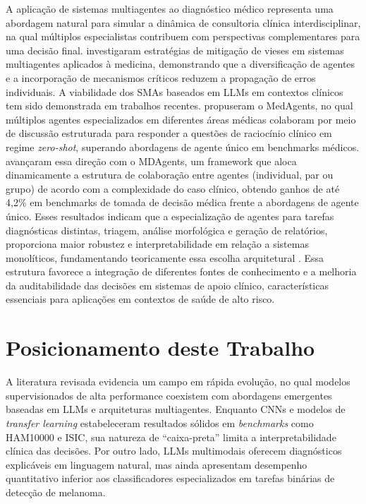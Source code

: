A aplicação de sistemas multiagentes ao diagnóstico médico representa uma abordagem natural para simular a dinâmica de consultoria clínica interdisciplinar, na qual múltiplos especialistas contribuem com perspectivas complementares para uma decisão final.  investigaram estratégias de mitigação de vieses em sistemas multiagentes aplicados à medicina, demonstrando que a diversificação de agentes e a incorporação de mecanismos críticos reduzem a propagação de erros individuais. A viabilidade dos SMAs baseados em LLMs em contextos clínicos tem sido demonstrada em trabalhos recentes.  propuseram o MedAgents, no qual múltiplos agentes especializados em diferentes áreas médicas colaboram por meio de discussão estruturada para responder a questões de raciocínio clínico em regime \textit{zero-shot}, superando abordagens de agente único em benchmarks médicos.  avançaram essa direção com o MDAgents, um framework que aloca dinamicamente a estrutura de colaboração entre agentes (individual, par ou grupo) de acordo com a complexidade do caso clínico, obtendo ganhos de até 4,2\% em benchmarks de tomada de decisão médica frente a abordagens de agente único. Esses resultados indicam que a especialização de agentes para tarefas diagnósticas distintas, triagem, análise morfológica e geração de relatórios, proporciona maior robustez e interpretabilidade em relação a sistemas monolíticos, fundamentando teoricamente essa escolha arquitetural \cite{wooldridge2009introduction}. Essa estrutura favorece a integração de diferentes fontes de conhecimento e a melhoria da auditabilidade das decisões em sistemas de apoio clínico, características essenciais para aplicações em contextos de saúde de alto risco.


\section{Posicionamento deste Trabalho}

A literatura revisada evidencia um campo em rápida evolução, no qual modelos supervisionados de alta performance coexistem com abordagens emergentes baseadas em LLMs e arquiteturas multiagentes. Enquanto CNNs e modelos de \textit{transfer learning} estabeleceram resultados sólidos em \textit{benchmarks} como HAM10000 e ISIC, sua natureza de ``caixa-preta'' limita a interpretabilidade clínica das decisões. Por outro lado, LLMs multimodais oferecem diagnósticos explicáveis em linguagem natural, mas ainda apresentam desempenho quantitativo inferior aos classificadores especializados em tarefas binárias de detecção de melanoma.

